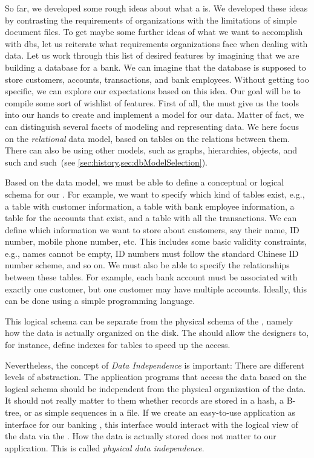 %
\label{sec:features}%
%
So far, we developed some rough ideas about what a  is.
We developed these ideas by contrasting the requirements of organizations with the limitations of simple document files.
To get maybe some further ideas of what we want to accomplish with \glspl{db}, let us reiterate what requirements organizations face when dealing with data.
Let us work through this list of desired features by imagining that we are building a database for a bank.
We can imagine that the database is supposed to store customers, accounts, transactions, and bank employees.
Without getting too specific, we can explore our expectations based on this idea.
Our goal will be to compile some sort of wishlist of features.%
%
%
First of all, the  must give us the tools into our hands to create and implement a model for our data.
Matter of fact, we can distinguish several facets of modeling and representing data.
We here focus on the \emph{relational} data model, based on tables on the relations between them.
There can also be  using other models, such as graphs, hierarchies, objects, and such and such~(see \cref{sec:history,sec:dbModelSelection}).

Based on the data model, we must be able to define a conceptual or logical schema for our .
For example, we want to specify which kind of tables exist, e.g., a table with customer information, a table with bank employee information, a table for the accounts that exist, and a table with all the transactions.
We can define which information we want to store about customers, say their name, ID number, mobile phone number, etc.
This includes some basic validity constraints, e.g., names cannot be empty, ID numbers must follow the standard Chinese ID number scheme, and so on.
We must also be able to specify the relationships between these tables.
For example, each bank account must be associated with exactly one customer, but one customer may have multiple accounts.
Ideally, this can be done using a simple programming language.

This logical schema can be separate from the physical schema of the , namely how the data is actually organized on the disk.
The  should allow the  designers to, for instance, define indexes for tables to speed up the access.

Nevertheless, the concept of \emph{Data Independence} is important:
There are different levels of abstraction.
The application programs that access the data based on the logical schema should be independent from the physical organization of the data.
It should not really matter to them whether records are stored in a hash, a B-tree, or as simple sequences in a file.
If we create an easy-to-use application as interface for our banking , this interface would interact with the logical view of the data via the .
How the data is actually stored does not matter to our application.
This is called \emph{physical data independence}.

